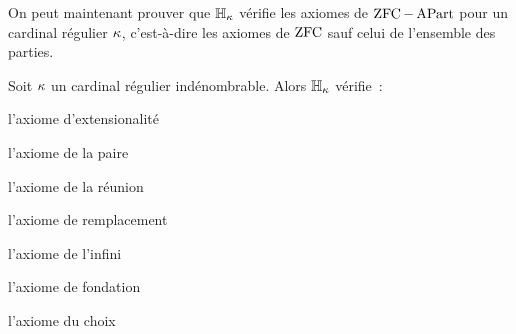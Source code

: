 On peut maintenant prouver que $\mathbb H_\kappa$ vérifie les axiomes de
$\operatorname{ZFC} - \operatorname{APart}$ pour un cardinal régulier $\kappa$, c'est-à-dire les axiomes de
$\operatorname{ZFC}$ sauf celui de l'ensemble des parties.

\begin{property}
  Soit $\kappa$ un cardinal régulier indénombrable. Alors $\mathbb H_\kappa$
  vérifie~:
  \begin{itemize}
    \begin{minipage}{0.4\textwidth}
    \item l'axiome d'extensionalité
    \item l'axiome de la paire
    \item l'axiome de la réunion
    \end{minipage}
    \begin{minipage}{0.4\textwidth}
    \item l'axiome de remplacement
    \item l'axiome de l'infini
    \item l'axiome de fondation
    \end{minipage}
    \vspace{0.15cm}
  \item l'axiome du choix
  \end{itemize}
\end{property}

